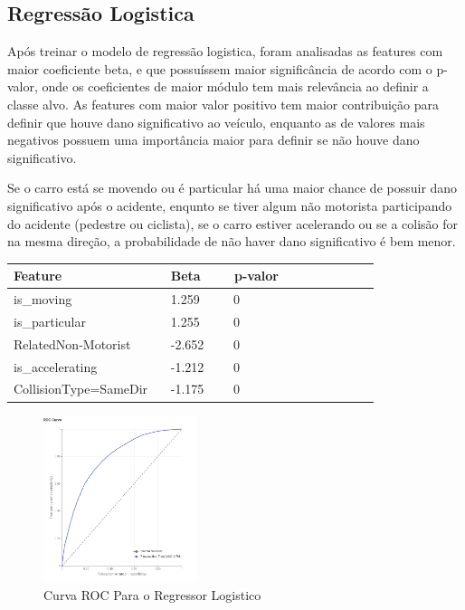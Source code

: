 \documentclass[conference]{IEEEtran}
\begin{document}
\subsection{Regressão Logistica}
Após treinar o modelo de regressão logistica, foram analisadas as features com maior coeficiente beta, e que possuíssem maior 
significância de acordo com o p-valor, onde os coeficientes de maior módulo tem mais relevância ao definir a classe alvo.
As features com maior valor positivo tem maior contribuição para definir que houve
dano significativo ao veículo, enquanto as de valores mais negativos possuem uma importância maior para definir se não houve dano significativo.

Se o carro está se movendo ou é particular há uma maior chance de possuir dano significativo após o acidente, enqunto se tiver algum não motorista
participando do acidente (pedestre ou ciclista), se o carro estiver acelerando ou se a colisão for na mesma direção, a probabilidade de 
não haver dano significativo é bem menor.

\begin{table}[!ht]
    \centering
    \begin{tabular}{|l|l|l|l|l|l|l|l|l|l|}
    \hline
        Feature~ & Beta~ & ~p-valor  \\ \hline
        is\_moving~ &  1.259~ & ~0  \\ \hline
        is\_particular~ & 1.255~ & ~0  \\ \hline
        RelatedNon-Motorist ~ & -2.652~ & ~0  \\ \hline
        is\_accelerating ~ & -1.212 ~ & ~0  \\ \hline
        CollisionType=SameDir ~ & -1.175 ~ & ~0  \\ \hline
    \end{tabular}
\end{table}



\begin{figure}[H]
    \centerline{\includegraphics[width=0.4\textwidth]{Images/roc-curve-regressor.png}}
    \caption{\label{fig:decision-tree} Curva ROC Para o Regressor Logistico}
\end{figure}
\end{document}
